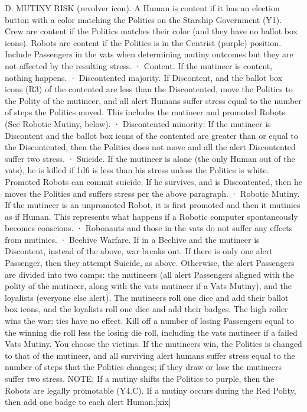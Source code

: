 \documentclass[a4paper]{book}
\begin{document}
D. MUTINY RISK (revolver icon). A Human is content if it has an election button with a color matching the Politics on the Starship Government (Y1).  Crew are content if the Politics matches their color (and they have no ballot box icons). Robots are content if the Politics is in the Centrist (purple) position. Include Passengers in the vats when determining mutiny outcomes but they are not affected by the resulting stress.
·       Content. If the mutineer is content, nothing happens.
·       Discontented majority. If Discontent, and the ballot box icons (R3) of the contented are less than the Discontented, move the Politics to the Polity of the mutineer, and all alert Humans suffer stress equal to the number of steps the Politics moved. This includes the mutineer and promoted Robots (See Robotic Mutiny, below).
·       Discontented minority: If the mutineer is Discontent and the ballot box icons of the contented are greater than or equal to the Discontented, then the Politics does not move and all the alert Discontented suffer two stress.
·       Suicide. If the mutineer is alone (the only Human out of the vats), he is killed if 1d6 is less than his stress unless the Politics is white. Promoted Robots can commit suicide. If he survives, and is Discontented, then he moves the Politics and suffers stress per the above paragraph.
·       Robotic Mutiny. If the mutineer is an unpromoted Robot, it is first promoted and then it mutinies as if Human. This represents what happens if a Robotic computer spontaneously becomes conscious.
·       Robonauts and those in the vats do not suffer any effects from mutinies.
·       Beehive Warfare. If in a Beehive and the mutineer is Discontent, instead of the above, war breaks out. If there is only one alert Passenger, then they attempt Suicide, as above. Otherwise, the alert Passengers are divided into two camps: the mutineers (all alert Passengers aligned with the polity of the mutineer, along with the vats mutineer if a Vats Mutiny), and the loyalists (everyone else alert). The mutineers roll one dice and add their ballot box icons, and the loyalists roll one dice and add their badges. The high roller wins the war; ties have no effect. Kill off a number of losing Passengers equal to the winning die roll less the losing die roll, including the vats mutineer if a failed Vats Mutiny. You choose the victims. If the mutineers win, the Politics is changed to that of the mutineer, and all surviving alert humans suffer stress equal to the number of steps that the Politics changes; if they draw or lose the mutineers suffer two stress.
NOTE: If a mutiny shifts the Politics to purple, then the Robots are legally promotable (Y4.C). If a mutiny occurs during the Red Polity, then add one badge to each alert Human.[xix]
 
\end{document}
